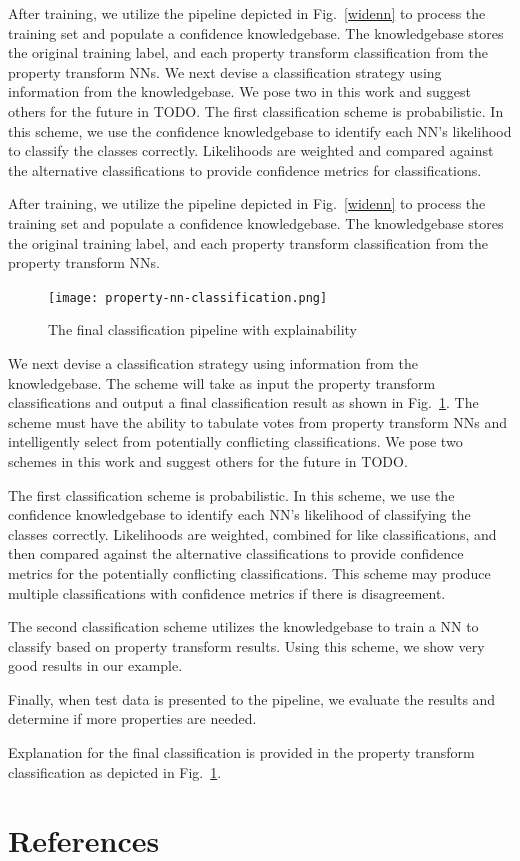 \documentclass[conference]{IEEEtran}
\begin{document}
After training, we utilize the pipeline depicted in Fig.~\ref{widenn} to process the training set and populate a confidence knowledgebase.  The knowledgebase stores the original training label, and each property transform classification from the property transform NNs.
We next devise a classification strategy using information from the knowledgebase.  We pose two in this work and suggest others for the future in TODO.
The first classification scheme is probabilistic.  In this scheme, we use the confidence knowledgebase to identify each NN's likelihood to classify the classes correctly.  Likelihoods are weighted and compared against the alternative classifications to provide confidence metrics for classifications.

After training, we utilize the pipeline depicted in Fig.~\ref{widenn} to process the training set and populate a confidence knowledgebase.  The knowledgebase stores the original training label, and each property transform classification from the property transform NNs.

\begin{figure}[htbp]
\centerline{\texttt{[image: property-nn-classification.png]}}
\caption{The final classification pipeline with explainability}
\label{widennexp}
\end{figure}

We next devise a classification strategy using information from the knowledgebase.  The scheme will take as input the property transform classifications and output a final classification result as shown in Fig.~\ref{widennexp}.   The scheme must have the ability to tabulate votes from property transform NNs and intelligently select from potentially conflicting classifications.  We pose two schemes in this work and suggest others for the future in TODO.

The first classification scheme is probabilistic.  In this scheme, we use the confidence knowledgebase to identify each NN's likelihood of classifying the classes correctly.  Likelihoods are weighted, combined for like classifications, and then compared against the alternative classifications to provide confidence metrics for the potentially conflicting classifications.  This scheme may produce multiple classifications with confidence metrics if there is disagreement.

The second classification scheme utilizes the knowledgebase to train a NN to classify based on property transform results.  Using this scheme, we show very good results in our example.

Finally, when test data is presented to the pipeline, we evaluate the results and determine if more properties are needed.

Explanation for the final classification is provided in the property transform classification as depicted in Fig.~\ref{widennexp}.
 

\section{References}



\vspace{12pt}
\end{document}
